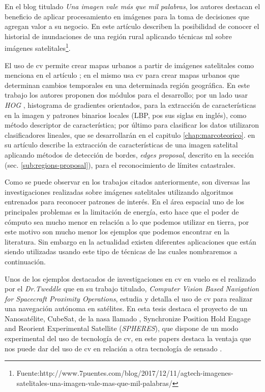 En el blog titulado \textit{Una imagen vale más que mil palabras}, los autores destacan el beneficio de aplicar procesamiento en imágenes para la toma de decisiones que agregan valor a su negocio. En este artículo describen la posibilidad de conocer el historial de inundaciones de una región rural aplicando técnicas \ac{ml} sobre imágenes satelitales\footnote{Fuente:http://www.7puentes.com/blog/2017/12/11/agtech-imagenes-satelitales-una-imagen-vale-mas-que-mil-palabras/}.

El uso de \ac{cv} permite crear mapas urbanos a partir de imágenes satelitales como menciona en el artículo \citep{detectionHOG}; en el mismo usa \ac{cv} para crear mapas urbanos que determinan cambios temporales en una determinada región geográfica. En este trabajo los autores proponen dos módulos para el desarrollo; por un lado usar \textit{HOG} , histograma de gradientes orientados,\citep{HOG_algoritmo} para la extracción de características en la imagen y patrones binarios locales (LBP, pos sus siglas en inglés)\citep{LBP}, como método descriptor de característica; por último para clasificar los datos utilizaron clasificadores lineales, que se desarrollarán en el capitulo \ref{chap:marcoteorico}. \cite{usman} en su artículo describe la extracción de características de una imagen satelital aplicando métodos de  detección de bordes, \textit{edges proposal}\citep{proposal}, descrito en la sección (sec. \ref{sub:regions-proposal}), para el reconocimiento de límites catastrales.

Como se puede observar en los trabajos citados anteriormente, son diversas las investigaciones realizadas sobre imágenes satelitales utilizando algoritmos entrenados para reconocer patrones de interés. En el área espacial uno de los principales problemas es la limitación de energía, esto hace que el poder de cómputo sea mucho menor en relación a lo que podemos utilizar en tierra, por este motivo son mucho menor los ejemplos que podemos encontrar en la literatura. Sin embargo en la actualidad existen diferentes aplicaciones que están siendo utilizadas usando este tipo de técnicas de las cuales nombraremos a continuación.

Unos de los ejemplos destacados de investigaciones en \ac{cv} en vuelo es el realizado por el \textit{Dr.Tweddle} que en su trabajo titulado, \textit{Computer Vision Based Navigation for Spacecraft Proximity Operations}, estudia y detalla el uso de \ac{cv} para realizar una navegación autónoma en satélites. En esta tesis destaca el proyecto de un Nanosatélite, CubeSat, de la \ac{nasa} llamado , Synchronize Position Hold Engage and Reorient Experimental Satellite (\textit{SPHERES}), que dispone de un modo experimental del uso de tecnología de \ac{cv}, en este papers destaca la ventaja que nos puede dar del uso de \ac{cv} en relación a otra tecnología de sensado \citep{Brent}.

